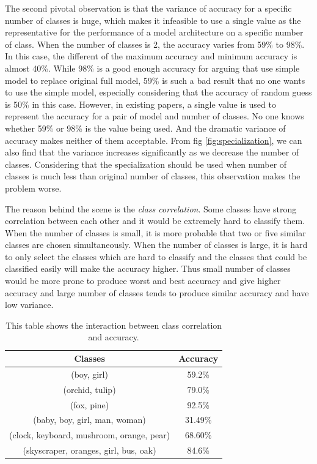 \documentclass[conference]{IEEEtran}
\begin{document}
\begin{spacing}{0.9}
The second pivotal observation is that the variance of accuracy for a specific number of classes is huge, which makes it infeasible to use a single value as the representative for the performance of a model architecture on a specific number of class. When the number of classes is 2, the accuracy varies from 59\% to 98\%. In this case, the different of the maximum accuracy and minimum accuracy is almost 40\%. While 98\% is a good enough accuracy for arguing that use simple model to replace original full model, 59\% is such a bad result that no one wants to use the simple model, especially considering that the accuracy of random guess is 50\% in this case. However, in existing papers, a single value is used to represent the accuracy for a pair of model and number of classes. No one knows whether 59\% or 98\% is the value being used. And the dramatic variance of accuracy makes neither of them acceptable. From fig \ref{fig:specialization}, we can also find that the variance increases significantly as we decrease the number of classes. Considering that the specialization should be used when number of classes is much less than original number of classes, this observation makes the problem worse.

The reason behind the scene is the \textit{class correlation}. Some classes have strong correlation between each other and it would be extremely hard to classify them. When the number of classes is small, it is more probable that two or five similar classes are chosen simultaneously. When the number of classes is large, it is hard to only select the classes which are hard to classify and the classes that could be classified easily will make the accuracy higher. Thus small number of classes would be more prone to produce worst and best accuracy and give higher accuracy and large number of classes tends to produce similar accuracy and have low variance. 

\begin{table}[!th]
    \centering
    \begin{tabular}{|c|c|}
        \hline
         Classes & Accuracy \\
         \hline
         (boy, girl) & 59.2\% \\
         (orchid, tulip) & 79.0\% \\
         (fox, pine) & 92.5\% \\
         \hline
        (baby, boy, girl, man, woman) &  31.49\% \\
        (clock, keyboard, mushroom, orange, pear) &  68.60\% \\
        (skyscraper, oranges, girl, bus, oak) & 84.6\% \\
        \hline
    \end{tabular}
    \vspace{1em}
    \caption{This table shows the interaction between class correlation and accuracy.  }
    \label{tab:classCorrelation}
\end{table}


\end{spacing}
\end{document}
